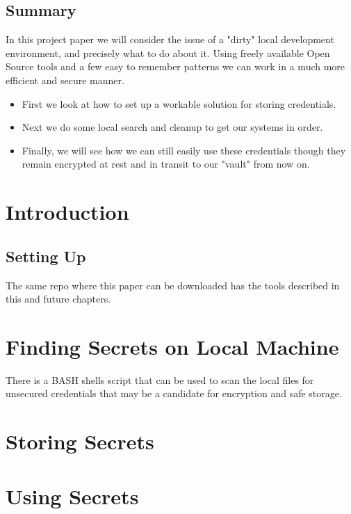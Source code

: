 \documentclass[11pt]{report}
\begin{document}
	\section*{Summary}
    In this project paper we will consider the issue of a "dirty" local development
    environment, and precisely what to do about it. Using freely available
    Open Source tools and a few easy to remember patterns we can work in a
    much more efficient and secure manner.

    \begin{itemize}
    	\item First we look at how to set up a workable solution for storing credentials.
		\item Next we do some local search and cleanup to get our systems in order.
		\item Finally, we will see how we can still easily use these credentials though
			they remain encrypted at rest and in transit to our "vault" from now on.
    \end{itemize}

	\cleardoublepage


	\tableofcontents
	\thispagestyle{empty}
	\cleardoublepage
	\setcounter{page}{1}


	\chapter{Introduction}

    \lipsum[1]

	\section{Setting Up}

	The same repo where this paper can be downloaded has the tools described in this and future chapters.

\chapter{Finding Secrets on Local Machine}

There is a BASH shells script that can be used to scan the local files for
unsecured credentials that may be a candidate for encryption and safe storage.

\chapter{Storing Secrets}

	\lipsum[1]

	\chapter{Using Secrets}

	\lipsum[1]

	
\end{document}
